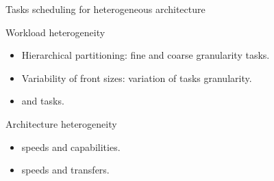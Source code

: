 \begin{frame}{Tasks scheduling for heterogeneous architecture}



  \begin{block}{Workload heterogeneity}
    \begin{itemize}
    \item \alert{Hierarchical partitioning}: fine and coarse
      granularity tasks.
    \item \alert{Variability of front sizes}: variation of tasks
      granularity.
    \item {} and  tasks.
    \end{itemize}    
  \end{block}


  \begin{block}{Architecture heterogeneity}
    \begin{itemize}
    \item {} speeds and capabilities.
    \item {} speeds and transfers.
    \end{itemize}
  \end{block}




\end{frame}
